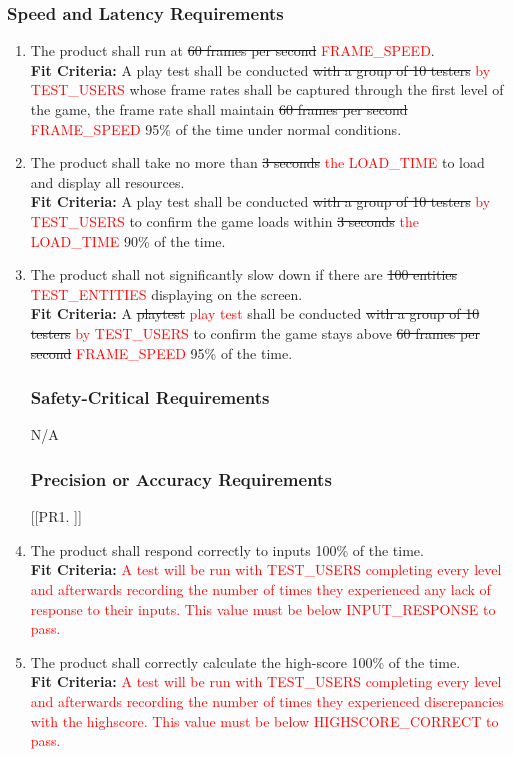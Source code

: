 \documentclass[12pt, titlepage]{article}
\begin{document}
\subsubsection{Speed and Latency Requirements}
\begin{enumerate}[{PR}1. ]
    \item The product shall run at \sout{60 frames per second} \textcolor{red}{FRAME\_SPEED}.\\
    \textbf{Fit Criteria:} A play test shall be conducted \sout{with a group of 10 testers} \textcolor{red}{by TEST\_USERS} whose frame rates shall be captured through the first level of the game, the frame rate shall maintain \sout{60 frames per second} \textcolor{red}{FRAME\_SPEED} 95\% of the time under normal conditions.
    \item The product shall take no more than \sout{3 seconds} \textcolor{red}{the LOAD\_TIME} to load and display all resources.\\
    \textbf{Fit Criteria:} A play test shall be conducted \sout{with a group of 10 testers} \textcolor{red}{by TEST\_USERS} to confirm the game loads within \sout{3 seconds} \textcolor{red}{the LOAD\_TIME} 90\% of the time.
    \item The product shall not significantly slow down if there are \sout{100 entities} \textcolor{red}{TEST\_ENTITIES} displaying on the screen.\\
    \textbf{Fit Criteria:} A \sout{playtest} \textcolor{red}{play test} shall be conducted \sout{with a group of 10 testers} \textcolor{red}{by TEST\_USERS} to confirm the game stays above \sout{60 frames per second} \textcolor{red}{FRAME\_SPEED} 95\% of the time.

\subsubsection{Safety-Critical Requirements}
N/A

\subsubsection{Precision or Accuracy Requirements}
[{[{PR}1. ]}]
    \item The product shall respond correctly to inputs 100\% of the time.\\
    \textbf{Fit Criteria:} \textcolor{red}{A test will be run with TEST\_USERS completing every level and afterwards recording the number of times they experienced any lack of response to their inputs. This value must be below INPUT\_RESPONSE to pass.}
    \item The product shall correctly calculate the high-score 100\% of the time.\\
    \textbf{Fit Criteria:} \textcolor{red}{A test will be run with TEST\_USERS completing every level and afterwards recording the number of times they experienced discrepancies with the highscore. This value must be below HIGHSCORE\_CORRECT to pass.}


\end{enumerate}
\end{document}
